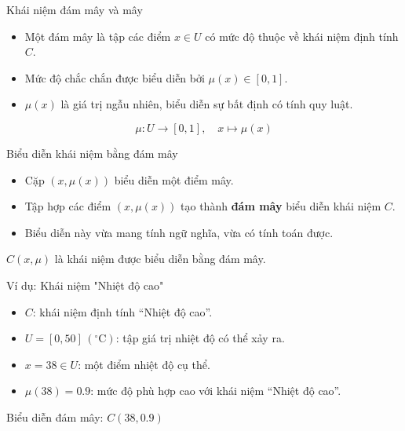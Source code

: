 \documentclass[10pt]{beamer}
\begin{document}
\begin{frame}{Khái niệm đám mây và mây}
\begin{itemize}
    \item Một đám mây là tập các điểm $x \in U$ có mức độ thuộc về khái niệm định tính $C$.
    \item Mức độ chắc chắn được biểu diễn bởi $\mu(x) \in [0,1]$.
    \item $\mu(x)$ là giá trị ngẫu nhiên, biểu diễn sự bất định có tính quy luật.
\end{itemize}

\vspace{1em}
\begin{equation*}
\mu : U \longrightarrow [0,1],\quad x \longmapsto \mu(x)
\end{equation*}
\end{frame}

\begin{frame}{Biểu diễn khái niệm bằng đám mây}
\begin{itemize}
    \item Cặp $(x, \mu(x))$ biểu diễn một điểm mây.
    \item Tập hợp các điểm $(x, \mu(x))$ tạo thành \textbf{đám mây} biểu diễn khái niệm $C$.
    \item Biểu diễn này vừa mang tính ngữ nghĩa, vừa có tính toán được.
\end{itemize}

\vspace{0.5em}
\centering
$C(x, \mu)$ là khái niệm được biểu diễn bằng đám mây.
\end{frame}


\begin{frame}{Ví dụ: Khái niệm "Nhiệt độ cao"}
\begin{itemize}
    \item $C$: khái niệm định tính “Nhiệt độ cao”.
    \item $U = [0, 50]\, (^\circ\mathrm{C})$: tập giá trị nhiệt độ có thể xảy ra.
    \item $x = 38 \in U$: một điểm nhiệt độ cụ thể.
    \item $\mu(38) = 0.9$: mức độ phù hợp cao với khái niệm “Nhiệt độ cao”.
\end{itemize}

\vspace{1em}
\centering
Biểu diễn đám mây: \quad $C(38, 0.9)$
\end{frame}
\end{document}
